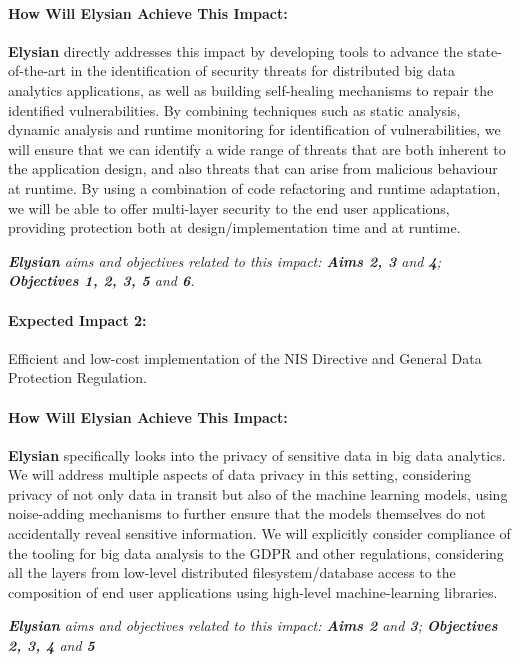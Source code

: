 \documentclass[a4paper,11pt]{article}
\newcommand{\project}[1]{\textbf{#1}\xspace}
\newcommand{\SECURITY}{\project{Elysian}}
\newcommand{\TheProject}{\SECURITY}
\begin{document}
\begin{mdframed}[backgroundcolor=gray!10]
\paragraph{How Will \TheProject{} Achieve This Impact:}
\TheProject{} directly addresses this impact by developing tools to advance the state-of-the-art in the identification of security threats for distributed big data analytics applications, as well as building  self-healing mechanisms to repair the identified vulnerabilities. By combining techniques such as static analysis, dynamic analysis and runtime monitoring for identification of vulnerabilities, we will ensure that we can identify a wide range of threats that are both inherent to the application design, and also threats that can arise from malicious behaviour at runtime. By using a combination of code refactoring and runtime adaptation, we will be able to offer multi-layer security to the end user applications, providing protection both at design/implementation time and at runtime.

\emph{\TheProject{} aims and objectives related to this impact: \textbf{Aims 2, 3 } and \textbf{4}; \textbf{Objectives 1, 2, 3, 5} and \textbf{6}.}
\end{mdframed}

\begin{mdframed}[backgroundcolor=blue!5]
\paragraph{Expected Impact 2:}
Efficient and low-cost implementation of the NIS Directive and General Data Protection Regulation.
\end{mdframed}

\begin{mdframed}[backgroundcolor=gray!10]
\paragraph{How Will \TheProject{} Achieve This Impact:}
\TheProject{} specifically looks into the privacy of sensitive data in big data analytics. We will address multiple aspects of data privacy in this setting, considering privacy of not only data in transit but also of the machine learning models, using noise-adding mechanisms to further ensure that the models themselves do not accidentally reveal sensitive information. We will explicitly consider compliance of the tooling for big data analysis to the GDPR and other regulations, considering all the layers from low-level distributed filesystem/database access to the composition of end user applications using high-level machine-learning libraries.

\emph{\TheProject{} aims and objectives related to this impact: \textbf{Aims 2}  and \textbf{3}; \textbf{Objectives 2, 3, 4} and \textbf{5} }
\end{mdframed}
\end{document}
